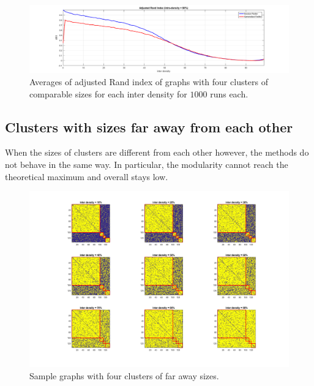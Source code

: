 \documentclass{amsart}
\begin{document}
			\begin{figure}[h]
			\begin{center}
				\includegraphics[width = \linewidth, trim = 70 0 70 10, clip]{four_comparable_clusters_ari}
				\caption{Averages of adjusted Rand index of graphs with four clusters of comparable sizes for each inter density for $1000$ runs each.}
				\label{four_comparable_clusters_ARI}
			\end{center}
			\end{figure}
	
		\subsection{Clusters with sizes far away from each other}
			When the sizes of clusters are different from each other however, the methods do not behave in the same way. In particular, the modularity cannot reach the theoretical maximum and overall stays low.
			\begin{figure}[h]
			\begin{center}
				\includegraphics[width = \linewidth, trim = 150 70 150 30, clip]{four_faraway_clusters_samples}
				\caption{Sample graphs with four clusters of far away sizes.}
				\label{four_faraway_clusters_samples}
			\end{center}
			\end{figure}
			
\end{document}
